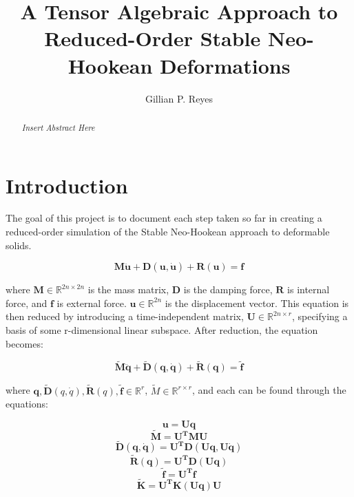\documentclass[twocolumn,10pt]{asme2ej}
\title{A Tensor Algebraic Approach to Reduced-Order Stable Neo-Hookean Deformations}
\author{Gillian P. Reyes
}
\begin{document}
\maketitle

\begin{abstract}
{\it Insert Abstract Here
}
\end{abstract}

\section{Introduction}

The goal of this project is to document each step taken so far in creating a reduced-order simulation of the Stable Neo-Hookean approach to deformable solids.

\begin{equation}
\bm{M\ddot u} + \bm{D}(\bm{u}, \bm{\dot u}) + \bm{R}(\bm{u}) = \bm{f}
\label{eq_motion}
\end{equation}

\noindent where $\bm{M} \in \mathbb{R}^{2n \times 2n }$ is the mass matrix, $\bm{D}$ is the damping force, $\bm{R}$ is internal force, and $\bm{f}$ is external force. $\bm{u} \in \mathbb{R}^{2n}$ is the displacement vector. This equation is then reduced by introducing a time-independent matrix, $\bm{U} \in \mathbb{R}^{2n \times r}$, specifying a basis of some r-dimensional linear subspace. After reduction, the equation becomes:

\begin{equation}
\bm{\tilde{M}\ddot q} + \bm{\tilde{D}}(\bm{q}, \bm{\dot q}) + \bm{\tilde{R}}(\bm{q}) = \bm{\tilde{f}}
\label{eq_rmotion}
\end{equation}

\noindent where $\bm{q}, \bm{\tilde{D}}(q, \dot q), \bm{\tilde{R}}(q), \bm{\tilde{f}} \in \mathbb{R}^{r}$, $\tilde{M} \in \mathbb{R}^{r \times r}$, and each
can be found through the equations:

\begin{equation}
\bm{u} = \bm{Uq}
\label{eq_basisreduction}
\end{equation}
\begin{equation}
\bm{\tilde{M}} = \bm{U^{T}MU}
\label{eq_rmass}
\end{equation}
\begin{equation}
\bm{\tilde{D}}(\bm{q}, \bm{\dot q}) = \bm{U^{T}D}(\bm{Uq}, \bm{U \dot q})
\label{eq_rdamp}
\end{equation}
\begin{equation}
\bm{\tilde{R}}(\bm{q}) = \bm{U^{T}D}(\bm{Uq})
\label{eq_rinternal}
\end{equation}
\begin{equation}
\bm{\tilde{f}} = \bm{U^{T}f}
\label{eq_rexternal}
\end{equation}
\begin{equation}
\bm{\tilde{K}} = \bm{U^{T}K}(\bm{Uq})\bm{U}
\label{eq_rstiffness}
\end{equation}
\end{document}

